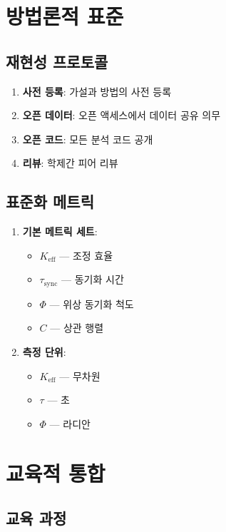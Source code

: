 \documentclass[12pt,a4paper]{article}
\begin{document}
	\section{방법론적 표준}
	
	\subsection{재현성 프로토콜}
	
	\begin{enumerate}
		\item \textbf{사전 등록}: 가설과 방법의 사전 등록
		\item \textbf{오픈 데이터}: 오픈 액세스에서 데이터 공유 의무
		\item \textbf{오픈 코드}: 모든 분석 코드 공개
		\item \textbf{리뷰}: 학제간 피어 리뷰
	\end{enumerate}
	
	\subsection{표준화 메트릭}
	
	\begin{enumerate}
		\item \textbf{기본 메트릭 세트}:
		\begin{itemize}
			\item $K_{\mathrm{eff}}$ — 조정 효율
			\item $\tau_{\mathrm{sync}}$ — 동기화 시간
			\item $\Phi$ — 위상 동기화 척도
			\item $C$ — 상관 행렬
		\end{itemize}
		
		\item \textbf{측정 단위}:
		\begin{itemize}
			\item $K_{\mathrm{eff}}$ — 무차원
			\item $\tau$ — 초
			\item $\Phi$ — 라디안
		\end{itemize}
	\end{enumerate}
	
	\section{교육적 통합}
	
	\subsection{교육 과정}
	
\end{document}
